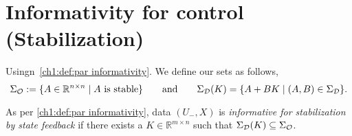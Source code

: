 \begin{comment}
	
	In a similar fashion, the conditions of Theorem~\ref{ch2:t:contstab} can be verified in a finite number of steps. Indeed, \eqref{ch2:eq:rank for cont} is equivalent to 
	\[ \rank(X_+)=n \textrm{ and } \rank ( X_+ -\lambda X_-) = n \]
	for all $\lambda\neq 0$ with $\lambda\inv\in\sigma(X_-X_+^\sharp)$, where $X_+^\sharp$ is any right inverse of $X_+$. Regarding stabilizability, we obtain that \eqref{ch2:eq:rank for stab} is equivalent to 
	\[\rank(X_+-X_-)=n \textrm { and } \rank ( X_+ -\lambda X_-) = n \]
	for all $\lambda\neq 1$ with $(\lambda-1)\inv\in\sigma(X_-(X_+-X_-)^\sharp)$.

\end{comment}
\section{Informativity for control (Stabilization)}
\label{sec:stability informativity}
Usingn~\ref{ch1:def:par informativity}. 
We define our sets as follows,
$$
\Sigma_{\mathcal{O}} :=  \{ A \in \mathbb{R}^{n \times n} \mid A \text{ is stable} \} \qquad\text{and}\qquad \Sigma_{\mathcal{D}}(K) = \{ A+ BK \mid (A,B) \in \Sigma_{\mathcal{D}} \}. 
$$

As per \ref{ch1:def:par informativity}, data $(U_-,X)$ is {\em informative for stabilization by state feedback} if there exists a $K \in \mathbb{R}^{m \times n}$ such that $\Sigma_{\mathcal{D}}(K) \subseteq \Sigma_{\mathcal{O}}$.


